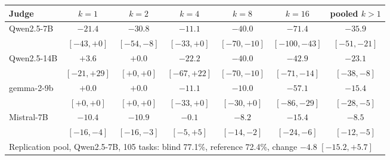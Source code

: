 \begin{tabular}{lcccccc}
\toprule
Judge & $k{=}1$ & $k{=}2$ & $k{=}4$ & $k{=}8$ & $k{=}16$ & pooled $k{>}1$ \\
\midrule
Qwen2.5-7B & $-21.4$ & $-30.8$ & $-11.1$ & $-40.0$ & $-71.4$ & $-35.9$ \\
 & {\scriptsize$[-43,+0]$} & {\scriptsize$[-54,-8]$} & {\scriptsize$[-33,+0]$} & {\scriptsize$[-70,-10]$} & {\scriptsize$[-100,-43]$} & {\scriptsize$[-51,-21]$} \\
Qwen2.5-14B & $+3.6$ & $+0.0$ & $-22.2$ & $-40.0$ & $-42.9$ & $-23.1$ \\
 & {\scriptsize$[-21,+29]$} & {\scriptsize$[+0,+0]$} & {\scriptsize$[-67,+22]$} & {\scriptsize$[-70,-10]$} & {\scriptsize$[-71,-14]$} & {\scriptsize$[-38,-8]$} \\
gemma-2-9b & $+0.0$ & $+0.0$ & $-11.1$ & $-10.0$ & $-57.1$ & $-15.4$ \\
 & {\scriptsize$[+0,+0]$} & {\scriptsize$[+0,+0]$} & {\scriptsize$[-33,+0]$} & {\scriptsize$[-30,+0]$} & {\scriptsize$[-86,-29]$} & {\scriptsize$[-28,-5]$} \\
Mistral-7B & $-10.4$ & $-10.9$ & $-0.1$ & $-8.2$ & $-15.4$ & $-8.5$ \\
 & {\scriptsize$[-16,-4]$} & {\scriptsize$[-16,-3]$} & {\scriptsize$[-5,+5]$} & {\scriptsize$[-14,-2]$} & {\scriptsize$[-24,-6]$} & {\scriptsize$[-12,-5]$} \\
\midrule
\multicolumn{7}{l}{Replication pool, Qwen2.5-7B, 105 tasks: blind 77.1\%, reference 72.4\%, change $-4.8$ {\scriptsize$[-15.2,+5.7]$}} \\
\bottomrule
\end{tabular}
